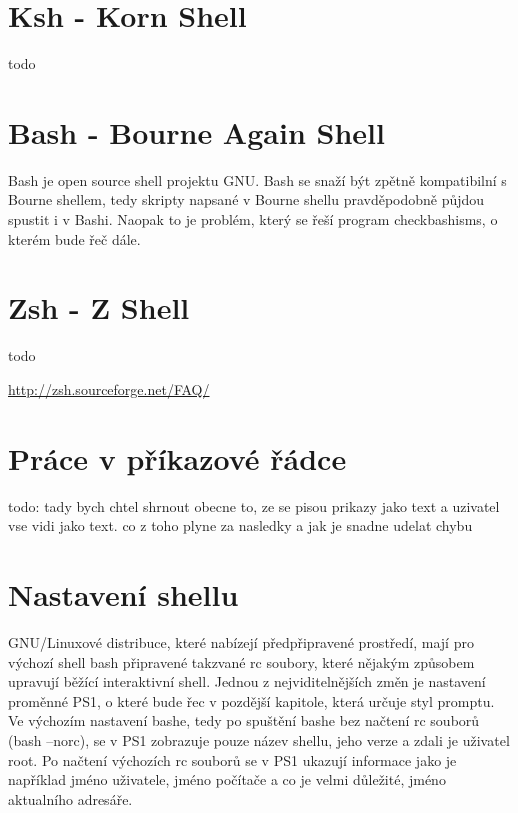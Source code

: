 \documentclass[thesis=M,czech]{FITthesis}[2012/06/26]
\begin{document}
%
%
%
\section{Ksh - Korn Shell}

todo

%
%
%
\section{Bash - Bourne Again Shell}

Bash je open source shell projektu GNU. Bash se snaží být zpětně kompatibilní s Bourne shellem, tedy skripty napsané v Bourne shellu pravděpodobně půjdou spustit i v Bashi. Naopak to je problém, který se řeší program checkbashisms, o kterém bude řeč dále.





%
%
%
\section{Zsh - Z Shell}

todo

\url{http://zsh.sourceforge.net/FAQ/}


\section{Práce v příkazové řádce}
todo: tady bych chtel shrnout obecne to, ze se pisou prikazy jako text a uzivatel vse vidi jako text. co z toho plyne za nasledky a jak je snadne udelat chybu

\section{Nastavení shellu}

GNU/Linuxové distribuce, které nabízejí předpřipravené prostředí, mají pro výchozí shell bash připravené takzvané rc soubory, které nějakým způsobem upravují běžící interaktivní shell. Jednou z nejviditelnějších změn je nastavení proměnné PS1, o které bude řec v pozdější kapitole, která určuje styl promptu. Ve výchozím nastavení bashe, tedy po spuštění bashe bez načtení rc souborů (bash --norc), se v PS1 zobrazuje pouze název shellu, jeho verze a zdali je uživatel root. Po načtení výchozích rc souborů se v PS1 ukazují informace jako je například jméno uživatele, jméno počítače a co je velmi důležité, jméno aktualního adresáře.
\end{document}
